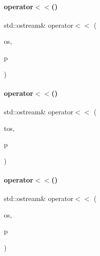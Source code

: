 \mbox{\label{_parts_8cpp_a2692dd3fd4bb8169a98820ed4cb9e018}} 
\paragraph{\texorpdfstring{operator$<$$<$()}{operator<<()}\hspace{0.1cm}{\footnotesize\ttfamily [7/20]}}
{\footnotesize\ttfamily std\+::ostream\& operator$<$$<$ (\begin{DoxyParamCaption}\item[{std\+::ostream \&}]{os,  }\item[{const \mbox{\hyperlink{class_m_o_b_o}{M\+O\+BO}} \&}]{p }\end{DoxyParamCaption})}

\mbox{\label{_parts_8cpp_a910424cdc7f138e807c1f067a09fc0e6}} 
\paragraph{\texorpdfstring{operator$<$$<$()}{operator<<()}\hspace{0.1cm}{\footnotesize\ttfamily [8/20]}}
{\footnotesize\ttfamily std\+::ostream\& operator$<$$<$ (\begin{DoxyParamCaption}\item[{\mbox{\hyperlink{structutos__ostream}{utos\+\_\+ostream}}}]{tos,  }\item[{const \mbox{\hyperlink{class_m_o_b_o}{M\+O\+BO}} \&}]{p }\end{DoxyParamCaption})}

\mbox{\label{_parts_8cpp_a6fdebbd47f8bac238a905dc2cc26f16d}} 
\paragraph{\texorpdfstring{operator$<$$<$()}{operator<<()}\hspace{0.1cm}{\footnotesize\ttfamily [9/20]}}
{\footnotesize\ttfamily std\+::ostream\& operator$<$$<$ (\begin{DoxyParamCaption}\item[{std\+::ostream \&}]{os,  }\item[{const \mbox{\hyperlink{class_r_a_m}{R\+AM}} \&}]{p }\end{DoxyParamCaption})}

